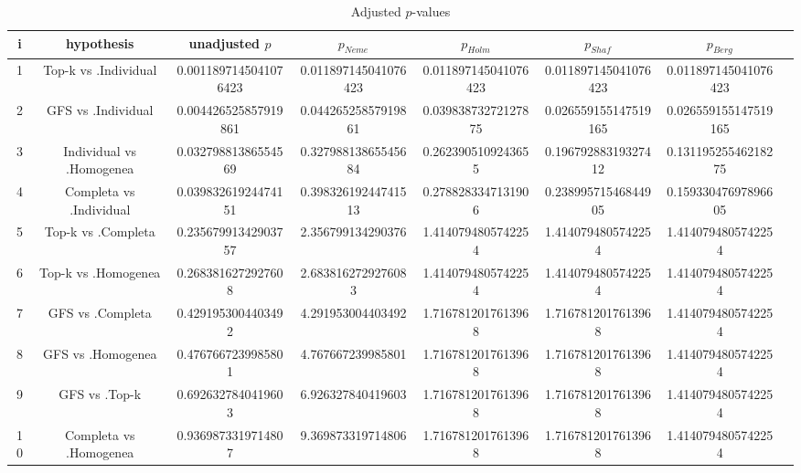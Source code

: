 \documentclass[a4paper,10pt]{article}
\begin{document}
\begin{landscape}
\begin{table}[!htp]
\centering\tiny
\caption{Adjusted $p$-values}
\begin{tabular}{cccccccc}
i&hypothesis&unadjusted $p$&$p_{Neme}$&$p_{Holm}$&$p_{Shaf}$&$p_{Berg}$\\
\hline
1&Top-k vs .Individual&0.0011897145041076423&0.011897145041076423&0.011897145041076423&0.011897145041076423&0.011897145041076423\\
2&GFS vs .Individual&0.004426525857919861&0.04426525857919861&0.03983873272127875&0.026559155147519165&0.026559155147519165\\
3&Individual vs .Homogenea&0.03279881386554569&0.32798813865545684&0.2623905109243655&0.19679288319327412&0.13119525546218275\\
4&Completa vs .Individual&0.03983261924474151&0.39832619244741513&0.2788283347131906&0.23899571546844905&0.15933047697896605\\
5&Top-k vs .Completa&0.23567991342903757&2.356799134290376&1.4140794805742254&1.4140794805742254&1.4140794805742254\\
6&Top-k vs .Homogenea&0.2683816272927608&2.6838162729276083&1.4140794805742254&1.4140794805742254&1.4140794805742254\\
7&GFS vs .Completa&0.4291953004403492&4.291953004403492&1.7167812017613968&1.7167812017613968&1.4140794805742254\\
8&GFS vs .Homogenea&0.4767667239985801&4.767667239985801&1.7167812017613968&1.7167812017613968&1.4140794805742254\\
9&GFS vs .Top-k&0.6926327840419603&6.926327840419603&1.7167812017613968&1.7167812017613968&1.4140794805742254\\
10&Completa vs .Homogenea&0.9369873319714807&9.369873319714806&1.7167812017613968&1.7167812017613968&1.4140794805742254\\
\hline
\end{tabular}
\end{table}

\end{landscape}
\end{document}
